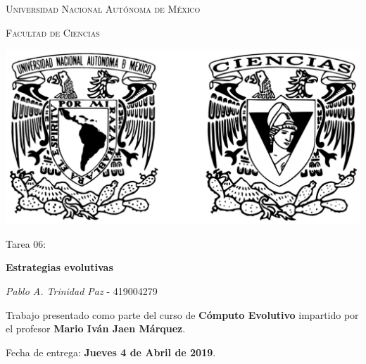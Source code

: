 \documentclass[10pt,letterpaper]{article}
\begin{document}
\begin{titlepage}
    \centering

    {\scshape\LARGE Universidad Nacional Autónoma de México \par}

    \vspace{1cm}
    {\scshape\Large Facultad de Ciencias\par}
    \vspace{1.5cm}

    \begin{center}
        \includegraphics[scale=.1]{../../assets/img/logo.png}
    \end{center}

    \vspace{.8 cm}

    {\LARGE Tarea 06: \par}
    {\huge\bfseries Estrategias evolutivas\par}

    \vspace{0.5cm}
    \large{\itshape{Pablo A. Trinidad Paz}} \small{ - 419004279}

    \vfill

    Trabajo presentado como parte del curso de
    \textbf{Cómputo Evolutivo}
    impartido por el profesor \textbf{Mario Iván Jaen Márquez}. \par
    \vspace{0.5cm}
    Fecha de entrega: \textbf{Jueves 4 de Abril de 2019}.
\end{titlepage}
\end{document}
